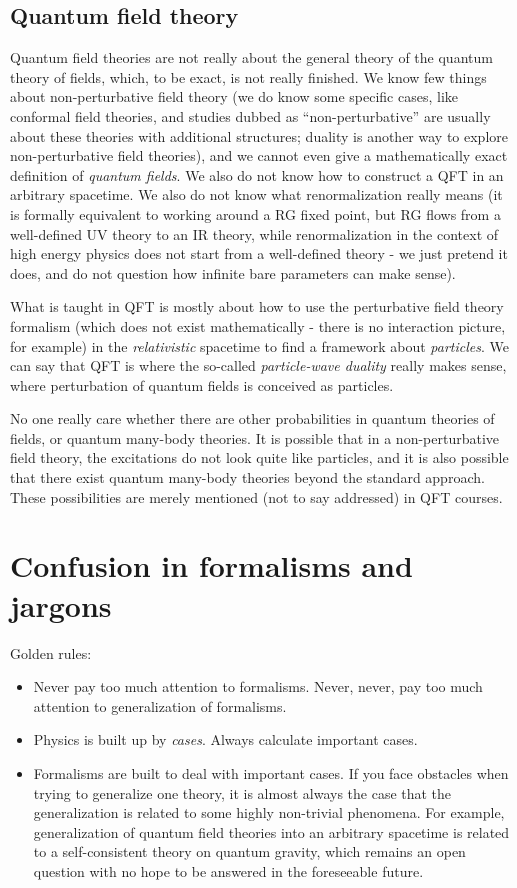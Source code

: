 \documentclass[hyperref, a4paper]{article}
\begin{document}
\subsection{Quantum field theory}

Quantum field theories are not really about the general theory of the quantum theory of fields, which, to be exact,
is not really finished. We know few things about non-perturbative field theory (we do know some specific cases, 
like conformal field theories, and studies dubbed as ``non-perturbative'' are usually about these theories with 
additional structures; duality is another way to explore non-perturbative field theories), and we cannot even 
give a mathematically exact definition of \emph{quantum fields}. We also do not know how to construct a QFT in 
an arbitrary spacetime. We also do not know what renormalization really means (it is formally equivalent to working 
around a RG fixed point, but RG flows from a well-defined UV theory to an IR theory, while renormalization in the 
context of high energy physics does not start from a well-defined theory - we just pretend it does, and do not
question how infinite bare parameters can make sense). 

What is taught in QFT is mostly about how to use the perturbative field theory formalism (which does not exist 
mathematically - there is no interaction picture, for example) in the \emph{relativistic} spacetime to find 
a framework about \emph{particles}. We can say that QFT is where the so-called \emph{particle-wave duality} 
really makes sense, where perturbation of quantum fields is conceived as particles. 

No one really care whether there are other probabilities in quantum theories of fields, or quantum many-body 
theories. It is possible that in a non-perturbative field theory, the excitations do not look quite like 
particles, and it is also possible that there exist quantum many-body theories beyond the standard approach.
These possibilities are merely mentioned (not to say addressed) in QFT courses.

\section{Confusion in formalisms and jargons}

Golden rules:
\begin{itemize}
    \item Never pay too much attention to formalisms. Never, never, pay too much attention to generalization of formalisms.
    \item Physics is built up by \emph{cases}. Always calculate important cases.
    \item Formalisms are built to deal with important cases. If you face obstacles when trying to generalize one theory, it is almost always the case that the generalization is related to some highly non-trivial phenomena.
    For example, generalization of quantum field theories into an arbitrary spacetime is related to a self-consistent theory on quantum gravity, which remains an open question with no hope to be answered in the foreseeable future.
\end{itemize}
\end{document}
